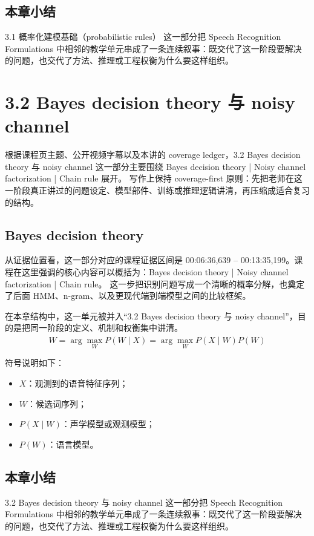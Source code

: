 \documentclass[a4paper]{article}
\begin{document}
\subsection{本章小结}
3.1 概率化建模基础（probabilistic rules） 这一部分把 Speech Recognition Formulations 中相邻的教学单元串成了一条连续叙事：既交代了这一阶段要解决的问题，也交代了方法、推理或工程权衡为什么要这样组织。

\section{3.2 Bayes decision theory 与 noisy channel}
根据课程页主题、公开视频字幕以及本讲的 coverage ledger，3.2 Bayes decision theory 与 noisy channel 这一部分主要围绕 Bayes decision theory | Noisy channel factorization | Chain rule 展开。
写作上保持 coverage-first 原则：先把老师在这一阶段真正讲过的问题设定、模型部件、训练或推理逻辑讲清，再压缩成适合复习的结构。

\subsection{Bayes decision theory}
从证据位置看，这一部分对应的课程证据区间是 00:06:36,639 -- 00:13:35,199。课程在这里强调的核心内容可以概括为：Bayes decision theory | Noisy channel factorization | Chain rule。
这一步把识别问题写成一个清晰的概率分解，也奠定了后面 HMM、n-gram、以及更现代端到端模型之间的比较框架。

在本章结构中，这一单元被并入“3.2 Bayes decision theory 与 noisy channel”，目的是把同一阶段的定义、机制和权衡集中讲清。
\[
\hat{W} = \arg\max_W P(W \mid X) = \arg\max_W P(X \mid W) P(W)
\]

符号说明如下：
\begin{itemize}
\item $X$：观测到的语音特征序列；
\item $W$：候选词序列；
\item $P(X \mid W)$：声学模型或观测模型；
\item $P(W)$：语言模型。
\end{itemize}

\subsection{本章小结}
3.2 Bayes decision theory 与 noisy channel 这一部分把 Speech Recognition Formulations 中相邻的教学单元串成了一条连续叙事：既交代了这一阶段要解决的问题，也交代了方法、推理或工程权衡为什么要这样组织。
\end{document}
